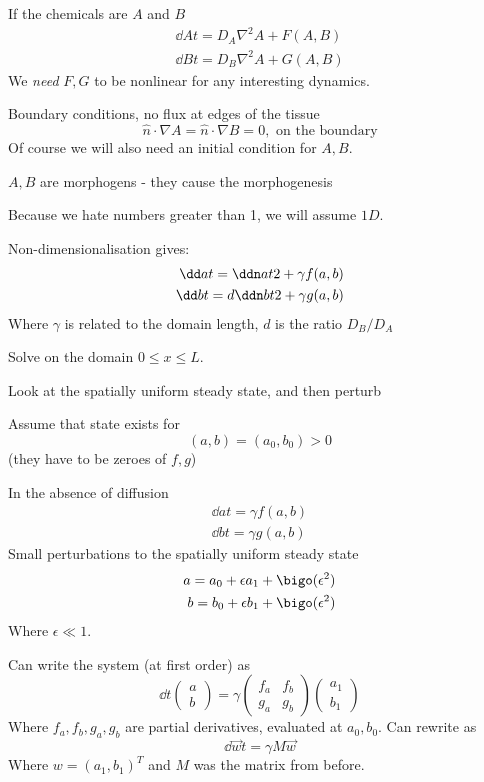 \documentclass{X:/Documents/Coding/Latex/myassignment}
\begin{document}
If the chemicals are $A$ and $B$
\begin{align*}
	\dd At = D_A \nabla^2 A + F(A,B)\\
	\dd Bt = D_B \nabla^2 A + G(A,B)
\end{align*}
We \textit{need} $F,G$ to be nonlinear for any interesting dynamics.

Boundary conditions, no flux at edges of the tissue
\[\hat{n}\cdot \nabla A = \hat{n}\cdot \nabla B = 0,  \text{ on the boundary}\]
Of course we will also need an initial condition for $A,B$.

$A,B$ are morphogens - they cause the morphogenesis

Because we hate numbers greater than 1, we will assume $1D$.

Non-dimensionalisation gives:
\begin{align*}
	\dd at = \ddn at2 + \gamma f(a,b)\\
	\dd bt = d\ddn bt2 + \gamma g(a,b)
\end{align*}
Where $\gamma$ is related to the domain length, $d$ is the ratio $D_B/D_A$

Solve on the domain $0 \leq x \leq L$. 

Look at the spatially uniform steady state, and then perturb

Assume that state exists for
\[(a,b) = (a_0,b_0) > 0\]
(they have to be zeroes of $f,g$)




In the absence of diffusion
\begin{align*}
	\dd at = \gamma f(a,b)\\
	\dd bt = \gamma g(a,b)
\end{align*}
Small perturbations to the spatially uniform steady state
\begin{align*}
	a = a_0 + \epsilon a_1 + \bigo(\epsilon^2)\\
	b = b_0 + \epsilon b_1 + \bigo(\epsilon^2)
\end{align*}
Where $\epsilon \ll 1$.


Can write the system (at first order) as
\[\dd{}t \begin{pmatrix}
	a\\b
\end{pmatrix} = \gamma \begin{pmatrix}
	f_a & f_b\\g_a & g_b
\end{pmatrix} \begin{pmatrix}
	a_1\\b_1
\end{pmatrix}\]
Where $f_a,f_b,g_a,g_b$ are partial derivatives, evaluated at $a_0,b_0$.
Can rewrite as
\[\dd{\vec w}t = \gamma M \vec w\]
Where $w = (a_1,b_1)^T$ and $M$ was the matrix from before.
\end{document}

